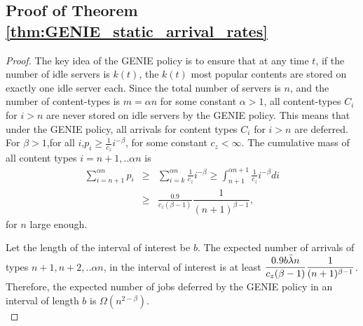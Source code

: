\documentclass[10pt, conference, letterpaper]{IEEEtran}
\def \idle {k}
\begin{document}
\subsection{Proof of Theorem \ref{thm:GENIE_static_arrival_rates}}
\begin{proof}
	The key idea of the GENIE policy is to ensure that at any time $t$, if the number of idle servers is $\idle (t)$, the $\idle (t)$ most popular contents are stored on exactly one idle server each. Since the total number of servers is $n$, and the number of content-types is $m = \alpha n$ for some constant $\alpha > 1$, all content-types $C_i$ for $i > n$ are never stored on idle servers by the GENIE policy. This means that under the GENIE policy, all arrivals for content types $C_i$ for $i > n$ are deferred. For $\beta > 1$,for all $i$,$p_i \geq \frac{1}{c_z} i^{-\beta}$, for some constant $c_z < \infty$.
	The cumulative mass of all content types $i = n+1, .. \alpha n$ is
	\begin{eqnarray*}
		\sum_{i=n+1}^{\alpha n} p_i &\geq& \sum_{i=k}^{\alpha n} \frac{1}{c_z } i^{-\beta} \geq \int_{n+1}^{\alpha n+1} \frac{1}{c_z } i^{-\beta} di \\
&\geq& \frac{0.9}{c_z  (\beta -1)} \dfrac{1}{(n+1)^{\beta-1}},
	\end{eqnarray*}
	for $n$ large enough.
	
	Let the length of the interval of interest be $b$. The expected number of arrivals of types $n+1, n+2, .. \alpha n$, in the interval of interest is at least $\dfrac{0.9 b \bar{\lambda} n}{c_z (\beta -1)} \\ \dfrac{1}{(n+1)^{\beta-1}}$. Therefore, the expected number of jobs deferred by the GENIE policy in an interval of length $b$ is $\Omega (n^{2-\beta})$.\\
\end{proof}
\end{document}
